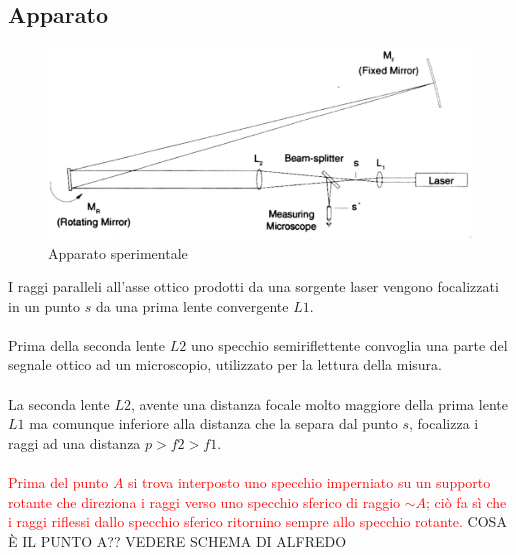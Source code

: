\subsection{Apparato}
%
    \begin{figure}[H]
    \centering
    \includegraphics[scale=.3]{Grafici/O1_apparatus.png}
    \caption{Apparato sperimentale}
    \end{figure} 
%
I raggi paralleli all'asse ottico prodotti da una sorgente laser vengono focalizzati in un punto $s$ da una prima lente convergente $L1$.\\\\
%
Prima della seconda lente $L2$ uno specchio semiriflettente convoglia una parte del segnale ottico ad un microscopio, utilizzato per la lettura della misura.\\\\
%
La seconda lente $L2$, avente una distanza focale molto maggiore della prima lente $L1$ ma comunque inferiore alla distanza che la separa dal punto $s$, focalizza i raggi ad una distanza $ p>f2>f1 $.\\\\
%
\textcolor{red}{Prima del punto $A$ si trova interposto uno specchio imperniato su un supporto rotante che direziona i raggi verso uno specchio sferico di raggio $\sim A$; ciò fa sì che i raggi riflessi dallo specchio sferico ritornino sempre allo specchio rotante.}
COSA È IL PUNTO A?? VEDERE SCHEMA DI ALFREDO